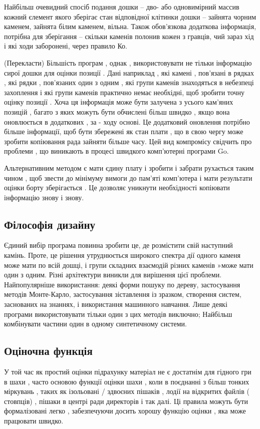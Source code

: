 Найбільш очевидний спосіб подання дошки -- дво- або одновимірний массив кожний єлемент якого зберігає стан відповідної клітинки дошки -- зайнята чорним каменем, зайнята білим каменем, вільна. Також обов'язкова додаткова інформація, потрібна для зберігання -- скільки каменів полонив кожен з гравців, чий зараз хід і які ходи заборонені, через правило Ко.

(Перекласти)
Більшість програм , однак , використовувати не тільки інформацію сирої дошки для оцінки позиції . Дані наприклад , які камені , пов'язані в рядках , які рядки , пов'язаних один з одним , які групи каменів знаходяться в небезпеці захоплення і які групи каменів практично немає необхідні, щоб зробити точну оцінку позиції . Хоча ця інформація може бути залучена з усього кам'яних позицій , багато з яких можуть бути обчислені більш швидко , якщо вона оновлюється в додаткових , за - ходу основі. Це додатковий оновлення потрібно більше інформації, щоб бути збережені як стан плати , що в свою чергу може зробити копіювання рада зайняти більше часу. Цей вид компромісу свідчить про проблеми , що виникають в процесі швидкого комп'ютерні програми Go.

Альтернативним методом є мати єдину плату і зробити і забрати рухається таким чином , щоб звести до мінімуму вимоги до пам'яті комп'ютера і мати результати оцінки борту зберігається . Це дозволяє уникнути необхідності копіювати інформацію знову і знову.
\subsection{Філософія дизайну}
Єдиний вибір програма повинна зробити це, де розмістити свій наступний камінь. Проте, це рішення утруднюється широкого спектра дії одного каменя може мати по всій дошці, і групи складних взаємодій різних каменів »може мати один з одним. Різні архітектури виникли для вирішення цієї проблеми. Найпопулярніше використання: деякі форми пошуку по дереву, застосування методів Монте-Карло, застосування зіставлення із зразком, створення систем, заснованих на знаннях, і використання машинного навчання. Лише деякі програми використовувати тільки один з цих методів виключно; Найбільш комбінувати частини один в одному синтетичному системи.
\subsection{Оціночна функція}
У той час як простий оцінки підрахунку матеріал не є достатнім для гідного гри в шахи , часто основою функції оцінки шахи , коли в поєднанні з більш тонких міркувань , таких як ізольовані / здвоєних пішаків , лодії на відкритих файлів ( стовпців) , пішаки в центрі ради директорів і так далі. Ці правила можуть бути формалізовані легко , забезпечуючи досить хорошу функцію оцінки , яка може працювати швидко.

